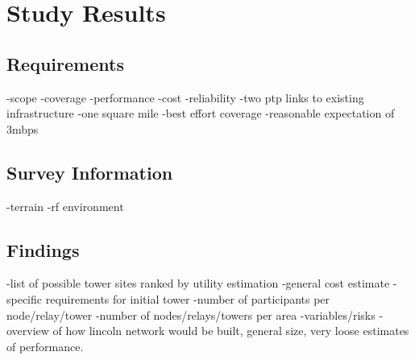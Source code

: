 \section{Study Results}\label{LPA}
\subsection{Requirements}
-scope -coverage -performance -cost -reliability
-two ptp links to existing infrastructure
-one square mile
-best effort coverage
-reasonable expectation of 3mbps
\subsection{Survey Information}
-terrain
-rf environment
\subsection{Findings}
-list of possible tower sites ranked by utility estimation
-general cost estimate
-specific requirements for initial tower
-number of participants per node/relay/tower
-number of nodes/relays/towers per area
-variables/risks
-overview of how lincoln network would be built, general size, very loose
estimates of performance. 
